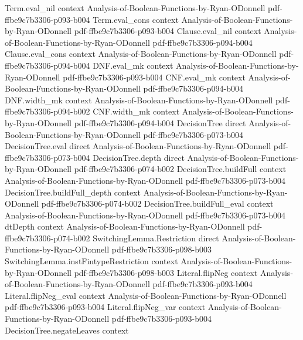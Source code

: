 \begin{theorem}
\proofstep
  {Term.eval_nil}
  {context}
  {Analysis-of-Boolean-Functions-by-Ryan-ODonnell}
  {pdf-ffbe9c7b3306-p093-b004}
\proofstep
  {Term.eval_cons}
  {context}
  {Analysis-of-Boolean-Functions-by-Ryan-ODonnell}
  {pdf-ffbe9c7b3306-p093-b004}
\proofstep
  {Clause.eval_nil}
  {context}
  {Analysis-of-Boolean-Functions-by-Ryan-ODonnell}
  {pdf-ffbe9c7b3306-p094-b004}
\proofstep
  {Clause.eval_cons}
  {context}
  {Analysis-of-Boolean-Functions-by-Ryan-ODonnell}
  {pdf-ffbe9c7b3306-p094-b004}
\proofstep
  {DNF.eval_mk}
  {context}
  {Analysis-of-Boolean-Functions-by-Ryan-ODonnell}
  {pdf-ffbe9c7b3306-p093-b004}
\proofstep
  {CNF.eval_mk}
  {context}
  {Analysis-of-Boolean-Functions-by-Ryan-ODonnell}
  {pdf-ffbe9c7b3306-p094-b004}
\proofstep
  {DNF.width_mk}
  {context}
  {Analysis-of-Boolean-Functions-by-Ryan-ODonnell}
  {pdf-ffbe9c7b3306-p094-b002}
\proofstep
  {CNF.width_mk}
  {context}
  {Analysis-of-Boolean-Functions-by-Ryan-ODonnell}
  {pdf-ffbe9c7b3306-p094-b004}
\proofstep
  {DecisionTree}
  {direct}
  {Analysis-of-Boolean-Functions-by-Ryan-ODonnell}
  {pdf-ffbe9c7b3306-p073-b004}
\proofstep
  {DecisionTree.eval}
  {direct}
  {Analysis-of-Boolean-Functions-by-Ryan-ODonnell}
  {pdf-ffbe9c7b3306-p073-b004}
\proofstep
  {DecisionTree.depth}
  {direct}
  {Analysis-of-Boolean-Functions-by-Ryan-ODonnell}
  {pdf-ffbe9c7b3306-p074-b002}
\proofstep
  {DecisionTree.buildFull}
  {context}
  {Analysis-of-Boolean-Functions-by-Ryan-ODonnell}
  {pdf-ffbe9c7b3306-p073-b004}
\proofstep
  {DecisionTree.buildFull_depth}
  {context}
  {Analysis-of-Boolean-Functions-by-Ryan-ODonnell}
  {pdf-ffbe9c7b3306-p074-b002}
\proofstep
  {DecisionTree.buildFull_eval}
  {context}
  {Analysis-of-Boolean-Functions-by-Ryan-ODonnell}
  {pdf-ffbe9c7b3306-p073-b004}
\proofstep
  {dtDepth}
  {context}
  {Analysis-of-Boolean-Functions-by-Ryan-ODonnell}
  {pdf-ffbe9c7b3306-p074-b002}
\proofstep
  {SwitchingLemma.Restriction}
  {direct}
  {Analysis-of-Boolean-Functions-by-Ryan-ODonnell}
  {pdf-ffbe9c7b3306-p098-b003}
\proofstep
  {SwitchingLemma.instFintypeRestriction}
  {context}
  {Analysis-of-Boolean-Functions-by-Ryan-ODonnell}
  {pdf-ffbe9c7b3306-p098-b003}
\proofstep
  {Literal.flipNeg}
  {context}
  {Analysis-of-Boolean-Functions-by-Ryan-ODonnell}
  {pdf-ffbe9c7b3306-p093-b004}
\proofstep
  {Literal.flipNeg_eval}
  {context}
  {Analysis-of-Boolean-Functions-by-Ryan-ODonnell}
  {pdf-ffbe9c7b3306-p093-b004}
\proofstep
  {Literal.flipNeg_var}
  {context}
  {Analysis-of-Boolean-Functions-by-Ryan-ODonnell}
  {pdf-ffbe9c7b3306-p093-b004}
\proofstep
  {DecisionTree.negateLeaves}
  {context}

\end{theorem}
